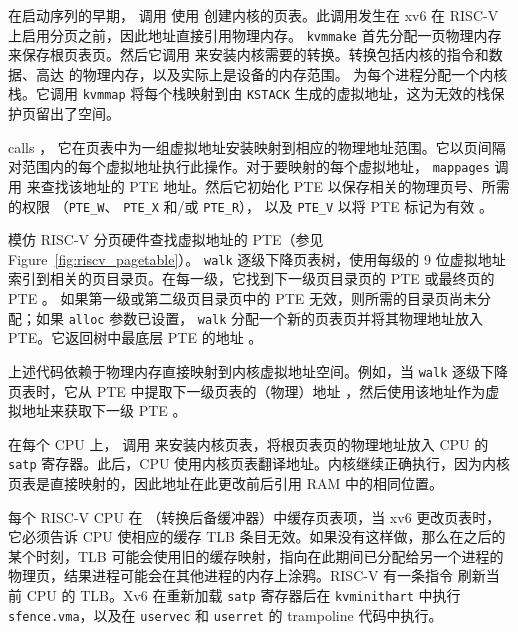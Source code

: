 在启动序列的早期，
调用
使用
创建内核的页表。此调用发生在 xv6 在 RISC-V 上启用分页之前，因此地址直接引用物理内存。
\lstinline{kvmmake}
首先分配一页物理内存来保存根页表页。然后它调用
来安装内核需要的转换。转换包括内核的指令和数据、高达
的物理内存，以及实际上是设备的内存范围。
为每个进程分配一个内核栈。它调用 \lstinline{kvmmap} 将每个栈映射到由
\lstinline{KSTACK}
生成的虚拟地址，这为无效的栈保护页留出了空间。

calls
，
它在页表中为一组虚拟地址安装映射到相应的物理地址范围。它以页间隔对范围内的每个虚拟地址执行此操作。对于要映射的每个虚拟地址，
\lstinline{mappages}
调用
来查找该地址的 PTE 地址。然后它初始化 PTE 以保存相关的物理页号、所需的权限
（\lstinline{PTE_W}、
\lstinline{PTE_X}
和/或
\lstinline{PTE_R}），
以及
\lstinline{PTE_V}
以将 PTE 标记为有效
。

模仿 RISC-V 分页硬件查找虚拟地址的 PTE（参见
Figure~\ref{fig:riscv_pagetable}）。
\lstinline{walk}
逐级下降页表树，使用每级的 9 位虚拟地址索引到相关的页目录页。在每一级，它找到下一级页目录页的 PTE 或最终页的 PTE
。
如果第一级或第二级页目录页中的 PTE 无效，则所需的目录页尚未分配；如果
\lstinline{alloc}
参数已设置，
\lstinline{walk}
分配一个新的页表页并将其物理地址放入 PTE。它返回树中最底层 PTE 的地址
。

上述代码依赖于物理内存直接映射到内核虚拟地址空间。例如，当 \lstinline{walk} 逐级下降页表时，它从 PTE 中提取下一级页表的（物理）地址 ，然后使用该地址作为虚拟地址来获取下一级 PTE
。

在每个 CPU 上，
调用
来安装内核页表，将根页表页的物理地址放入 CPU 的
\texttt{satp}
寄存器。此后，CPU 使用内核页表翻译地址。内核继续正确执行，因为内核页表是直接映射的，因此地址在此更改前后引用 RAM 中的相同位置。

每个 RISC-V CPU 在
（转换后备缓冲器）中缓存页表项，当 xv6 更改页表时，它必须告诉 CPU 使相应的缓存 TLB 条目无效。如果没有这样做，那么在之后的某个时刻，TLB 可能会使用旧的缓存映射，指向在此期间已分配给另一个进程的物理页，结果进程可能会在其他进程的内存上涂鸦。RISC-V 有一条指令  刷新当前 CPU 的 TLB。Xv6 在重新加载
\texttt{satp}
寄存器后在 {\tt kvminithart} 中执行 {\tt sfence.vma}，以及在
\lstinline{uservec}
和 \lstinline{userret} 的 trampoline 代码中执行。

